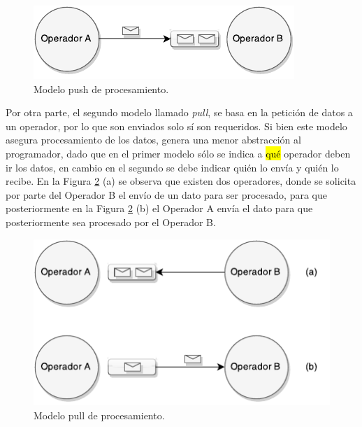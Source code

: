 \begin{figure}[ht!]
  \centering
    \includegraphics[scale=1]{images/SPS-Push.pdf}
  \caption{Modelo push de procesamiento.}
  \label{fig:sps-push}
\end{figure}

Por otra parte, el segundo modelo llamado \textit{pull}, se basa en la petición de datos a un operador, por lo que son enviados solo sí son requeridos. Si bien este modelo asegura procesamiento de los datos, genera una menor abstracción al programador, dado que en el primer modelo sólo se indica a \hl{qué} operador deben ir los datos, en cambio en el segundo se debe indicar quién lo envía y quién lo recibe. En la Figura \ref{fig:sps-pull} (a) se observa que existen dos operadores, donde se solicita por parte del Operador B el envío de un dato para ser procesado, para que posteriormente en la Figura \ref{fig:sps-pull} (b) el Operador A envía el dato para que posteriormente sea procesado por el Operador B.

\begin{figure}[ht!]
  \centering
    \includegraphics[scale=1]{images/SPS-Pull.pdf}
  \caption{Modelo pull de procesamiento.}
  \label{fig:sps-pull}
\end{figure}

